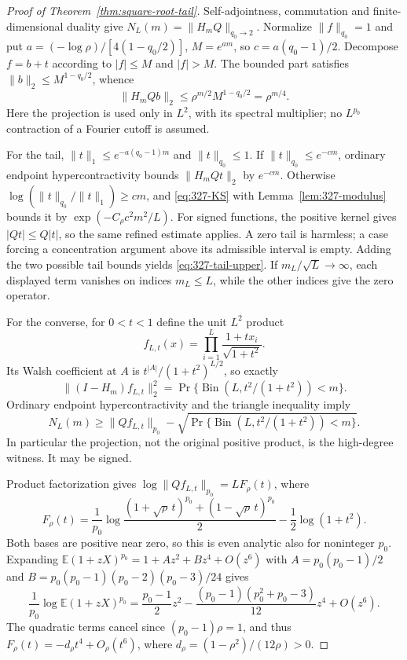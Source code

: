 \begin{proof}[Proof of Theorem~\ref{thm:square-root-tail}]
Self-adjointness, commutation and finite-dimensional duality give
$N_L(m)=\|H_mQ\|_{q_0\to2}$. Normalize $\|f\|_{q_0}=1$ and put
$a=(-\log\rho)/[4(1-q_0/2)]$, $M=e^{am}$, so $c=a(q_0-1)/2$.
Decompose $f=b+t$ according to $|f|\leq M$ and $|f|>M$.
The bounded part satisfies $\|b\|_2\leq M^{1-q_0/2}$, whence
\[
 \|H_mQb\|_2\leq\rho^{m/2}M^{1-q_0/2}=\rho^{m/4}.
\]
Here the projection is used only in $L^2$, with its spectral multiplier;
no $L^{p_0}$ contraction of a Fourier cutoff is assumed.

For the tail, $\|t\|_1\leq e^{-a(q_0-1)m}$ and $\|t\|_{q_0}\leq1$.
If $\|t\|_{q_0}\leq e^{-cm}$, ordinary endpoint hypercontractivity
bounds $\|H_mQt\|_2$ by $e^{-cm}$. Otherwise
$\log(\|t\|_{q_0}/\|t\|_1)\geq cm$, and
\eqref{eq:327-KS} with Lemma~\ref{lem:327-modulus} bounds it by
$\exp(-C_\rho c^2m^2/L)$.
For signed functions, the positive kernel gives
$|Qt|\leq Q|t|$, so the same refined estimate applies. A zero tail is
harmless; a case forcing a concentration argument above its admissible
interval is empty. Adding the two possible tail bounds yields
\eqref{eq:327-tail-upper}. If $m_L/\sqrt L\to\infty$, each displayed
term vanishes on indices $m_L\leq L$, while the other indices give
the zero operator.

For the converse, for $0<t<1$ define the unit $L^2$ product
\[
 f_{L,t}(x)=\prod_{i=1}^L\frac{1+tx_i}{\sqrt{1+t^2}}.
\]
Its Walsh coefficient at $A$ is $t^{|A|}/(1+t^2)^{L/2}$, so exactly
\[
 \|(I-H_m)f_{L,t}\|_2^2
 =\Pr\{\operatorname{Bin}(L,t^2/(1+t^2))<m\}.
\]
Ordinary endpoint hypercontractivity and the triangle inequality imply
\begin{equation}\label{eq:327-witness}
 N_L(m)\geq\|Qf_{L,t}\|_{p_0}
 -\sqrt{\Pr\{\operatorname{Bin}(L,t^2/(1+t^2))<m\}}.
\end{equation}
In particular the projection, not the original positive product, is the
high-degree witness. It may be signed.

Product factorization gives $\log\|Qf_{L,t}\|_{p_0}=LF_\rho(t)$, where
\[
 F_\rho(t)=\frac1{p_0}\log\frac{(1+\sqrt\rho\,t)^{p_0}
                                  +(1-\sqrt\rho\,t)^{p_0}}2
                  -\frac12\log(1+t^2).
\]
Both bases are positive near zero, so this is even analytic also for
noninteger $p_0$. Expanding
$\mathbb E(1+zX)^{p_0}=1+A z^2+Bz^4+O(z^6)$ with
$A=p_0(p_0-1)/2$ and $B=p_0(p_0-1)(p_0-2)(p_0-3)/24$ gives
\[
 \frac1{p_0}\log\mathbb E(1+zX)^{p_0}
 =\frac{p_0-1}{2}z^2
 -\frac{(p_0-1)(p_0^2+p_0-3)}{12}z^4+O(z^6).
\]
The quadratic terms cancel since $(p_0-1)\rho=1$, and thus
$F_\rho(t)=-d_\rho t^4+O_\rho(t^6)$, where
$d_\rho=(1-\rho^2)/(12\rho)>0$.


\end{proof}
